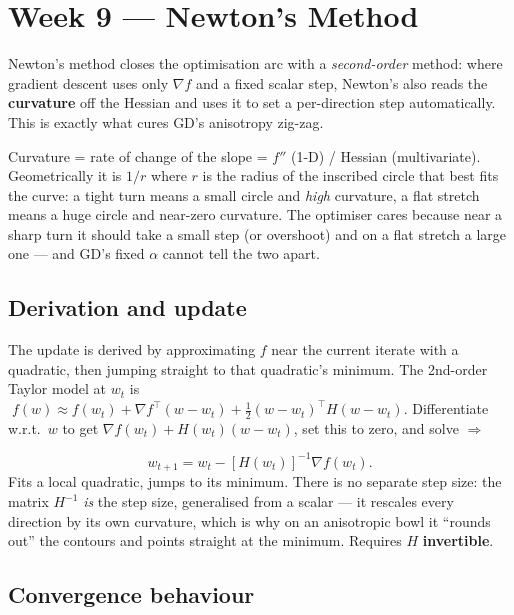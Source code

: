 \documentclass[11pt, a4paper]{article}
\newcommand{\kw}[1]{\textbf{#1}}
\begin{document}
\section{Week 9 — Newton's Method}

Newton's method closes the optimisation arc with a \emph{second-order} method: where gradient descent
uses only $\nabla f$ and a fixed scalar step, Newton's also reads the \kw{curvature} off the Hessian
and uses it to set a per-direction step automatically. This is exactly what cures GD's
anisotropy zig-zag.

\begin{defbox}[curvature]
Curvature = rate of change of the slope = $f''$ (1-D) / Hessian (multivariate). Geometrically it is
$1/r$ where $r$ is the radius of the inscribed circle that best fits the curve: a tight turn means a
small circle and \emph{high} curvature, a flat stretch means a huge circle and near-zero curvature.
The optimiser cares because near a sharp turn it should take a small step (or overshoot) and on a
flat stretch a large one — and GD's fixed $\alpha$ cannot tell the two apart.
\end{defbox}

\subsection{Derivation and update}

The update is derived by approximating $f$ near the current iterate with a quadratic, then jumping
straight to that quadratic's minimum. The 2nd-order Taylor model at $w_t$ is
$\;f(w)\approx f(w_t)+\nabla f^\top(w-w_t)+\tfrac12(w-w_t)^\top H(w-w_t)$. Differentiate w.r.t.\ $w$
to get $\nabla f(w_t)+H(w_t)(w-w_t)$, set this to zero, and solve $\Rightarrow$
\begin{defbox}
\[
w_{t+1}=w_t-[H(w_t)]^{-1}\nabla f(w_t).
\]
Fits a local quadratic, jumps to its minimum. There is no separate step size: the matrix $H^{-1}$
\emph{is} the step size, generalised from a scalar — it rescales every direction by its own
curvature, which is why on an anisotropic bowl it ``rounds out'' the contours and points straight at
the minimum. Requires $H$ \kw{invertible}.
\end{defbox}

\subsection{Convergence behaviour}
\end{document}
